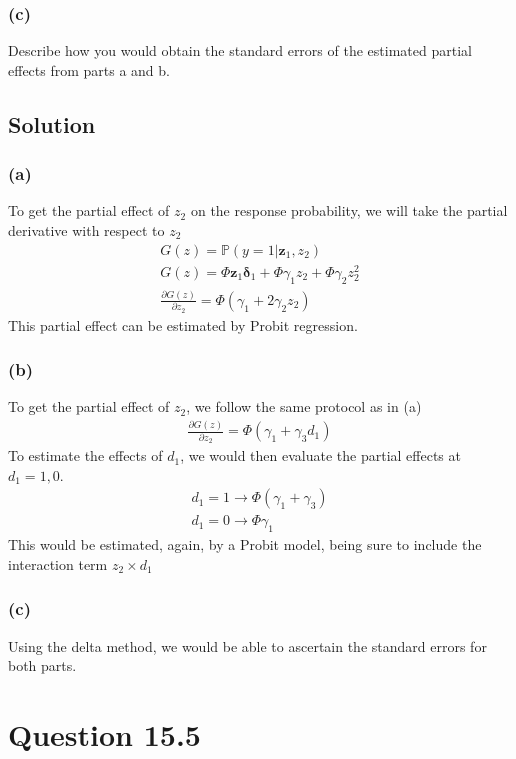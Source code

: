 \documentclass[10pt, a4paper]{article}
\newcommand{\PP}{\mathbb P}
\begin{document}
      \subsubsection*{(c)}
        Describe how you would obtain the standard errors of the estimated partial effects from parts a and b.
    \subsection*{Solution}
      \subsubsection*{(a)}
        To get the partial effect of $z_2$ on the response probability, we will take the partial derivative with respect to $z_2$
        \begin{gather*}
          G(z) = \PP(y=1|\textbf{z}_1,z_2) \\
          G(z) = \Phi\textbf{z}_1\boldsymbol{\delta}_1 + \Phi\gamma_1z_2 + \Phi\gamma_2z_2^2 \\
          \boxed{\frac{\partial G(z)}{\partial z_2} = \Phi(\gamma_1+2\gamma_2z_2)} 
        \end{gather*}
        This partial effect can be estimated by Probit regression.
      \subsubsection*{(b)}
        To get the partial effect of $z_2$, we follow the same protocol as in (a)
        \begin{gather*}
          \frac{\partial G(z)}{\partial z_2} = \Phi(\gamma_1+\gamma_3d_1)
        \end{gather*}
        To estimate the effects of $d_1$, we would then evaluate the partial effects at $d_1 = 1, 0$.
        \begin{gather*}
          d_1 = 1 \rightarrow \Phi(\gamma_1 + \gamma_3) \\
          d_1 = 0 \rightarrow \Phi\gamma_1
        \end{gather*}
        This would be estimated, again, by a Probit model, being sure to include the interaction term $z_2\times d_1$
      \subsubsection*{(c)}
        Using the delta method, we would be able to ascertain the standard errors for both parts.
\section*{Question 15.5}
\end{document}
